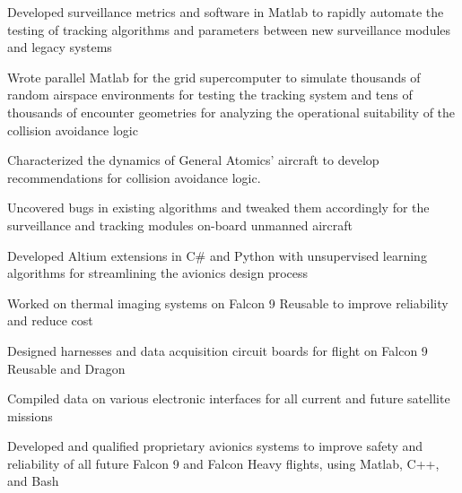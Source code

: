 \documentclass[letterpaper]{article}
\begin{document}
\begin{compactitem}
	\item Developed surveillance metrics and software in Matlab to rapidly automate the testing of tracking algorithms and parameters between new surveillance modules and legacy systems\\
	\item Wrote parallel Matlab for the grid supercomputer to simulate thousands of random airspace environments for testing the tracking system and tens of thousands of encounter geometries for analyzing the operational suitability of the collision avoidance logic\\
	\item Characterized the dynamics of General Atomics' aircraft to develop recommendations for collision avoidance logic.\\
	\item Uncovered bugs in existing algorithms and tweaked them accordingly for the surveillance and tracking modules on-board unmanned aircraft
\end{compactitem}

\begin{compactitem}
	\item Developed Altium extensions in C\# and Python with unsupervised learning algorithms for streamlining the avionics design process\\
	\item Worked on thermal imaging systems on Falcon 9 Reusable to improve reliability and reduce cost\\
	\item Designed harnesses and data acquisition circuit boards for flight on Falcon 9 Reusable and Dragon\\
	\item Compiled data on various electronic interfaces for all current and future satellite missions\\
	\item Developed and qualified proprietary avionics systems to improve safety and reliability of all future Falcon 9 and Falcon Heavy flights, using Matlab, C++, and Bash
\end{compactitem}
\end{document}
